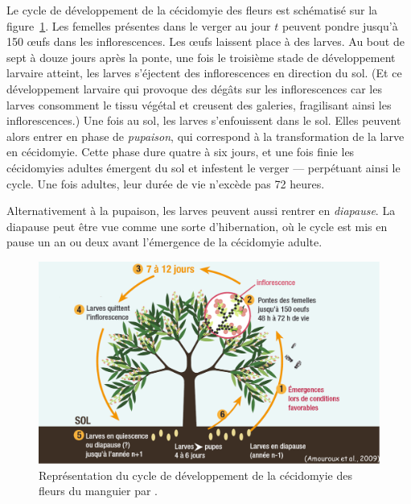 
Le cycle de développement de la cécidomyie des fleurs est schématisé sur la figure~\ref{fig:cycle}.
Les femelles présentes dans le verger au jour $t$ peuvent pondre jusqu'à 150 œufs dans les inflorescences.
Les œufs laissent place à des larves.
Au bout de sept à douze jours après la ponte, une fois le troisième stade de développement larvaire atteint, les larves s'éjectent des inflorescences en direction du sol.
(Et ce développement larvaire qui provoque des dégâts sur les inflorescences car les larves consomment le tissu végétal et creusent des galeries, fragilisant ainsi les inflorescences.)
Une fois au sol, les larves s'enfouissent dans le sol. 
Elles peuvent alors entrer en phase de \emph{pupaison}, qui correspond à la transformation de la larve en cécidomyie.
Cette phase dure quatre à six jours, et une fois finie les cécidomyies adultes émergent du sol et infestent le verger --- perpétuant ainsi le cycle. 
Une fois adultes, leur durée de vie n'excède pas 72 heures.

Alternativement à la pupaison, les larves peuvent aussi rentrer en \emph{diapause}.
La diapause peut être vue comme une sorte d'hibernation, où le cycle est mis en pause un an ou deux avant l'émergence de la cécidomyie adulte.


%
\begin{figure}
 \centering
 \includegraphics[scale = 0.33]{photos/cycle.png}
 \caption{Représentation du cycle de développement de la cécidomyie des fleurs du manguier par \citet{paulguide}.}
 \label{fig:cycle}
\end{figure}
%

